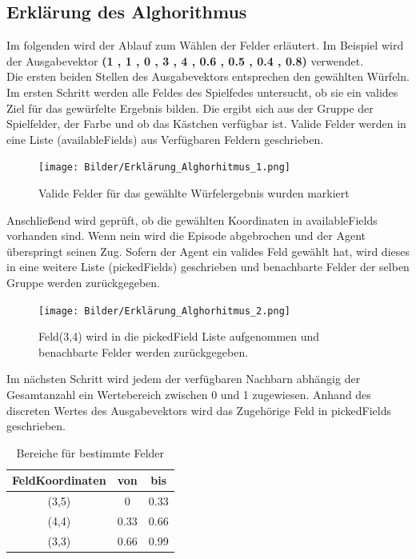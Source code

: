 \newpage
\subsection{Erklärung des Alghorithmus}
Im folgenden wird der Ablauf zum Wählen der Felder erläutert. Im Beispiel wird der Ausgabevektor \textbf{(1 , 1 , 0 , 3 , 4 , 0.6 , 0.5 , 0.4 , 0.8)} verwendet. \\
Die ersten beiden Stellen des Ausgabevektors entsprechen den gewählten Würfeln.
Im ersten Schritt werden alle Feldes des Spielfedes untersucht, ob sie ein valides Ziel für das gewürfelte Ergebnis bilden.
Die ergibt sich aus der Gruppe der Spielfelder, der Farbe und ob das Kästchen verfügbar ist.
Valide Felder werden in eine Liste (availableFields) aus Verfügbaren Feldern geschrieben.

\begin{figure}[!h]
	\centering
	\texttt{[image: Bilder/Erklärung\_Alghorhitmus\_1.png]}
	\caption{Valide Felder für das gewählte Würfelergebnis wurden markiert}
\end{figure}

Anschließend wird geprüft, ob die gewählten Koordinaten in availableFields vorhanden sind.
Wenn nein wird die Episode abgebrochen und der Agent überspringt seinen Zug.
Sofern der Agent ein valides Feld gewählt hat, wird dieses in eine weitere Liste (pickedFields) geschrieben und benachbarte Felder der selben Gruppe werden zurückgegeben.

\newpage
\begin{figure}[!h]
	\centering
	\texttt{[image: Bilder/Erklärung\_Alghorhitmus\_2.png]}
	\caption{Feld(3,4) wird in die pickedField Liste aufgenommen und benachbarte Felder werden zurückgegeben.}
\end{figure}

Im nächsten Schritt wird jedem der verfügbaren Nachbarn abhängig der Gesamtanzahl ein Wertebereich zwischen 0 und 1 zugewiesen. Anhand des discreten Wertes des Ausgabevektors wird das Zugehörige Feld in pickedFields geschrieben.
\begin{table}[htbp]
    \centering
    \begin{tabular}{|c|c|c|}
    \hline
    \textbf{FeldKoordinaten} & \textbf{von} & \textbf{bis} \\
    \hline
    (3,5) & 0 & 0.33 \\
    \hline
    (4,4) & 0.33 & 0.66 \\
    \hline
    (3,3) & 0.66 & 0.99 \\
    \hline
    \end{tabular}
    \caption{Bereiche für bestimmte Felder}
    \label{tab:field_ranges}
\end{table}

